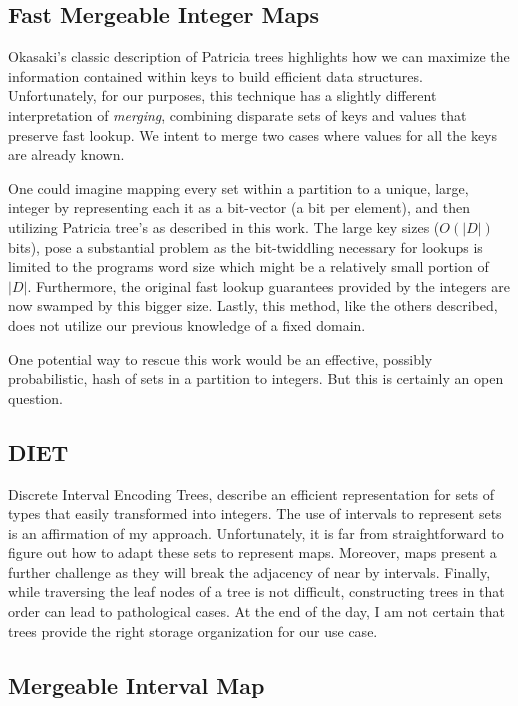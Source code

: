 \documentclass{article}
\begin{document}
\subsection{Fast Mergeable Integer Maps}

Okasaki's classic description\cite{Okasaki1998} of Patricia trees highlights how
we can maximize the information contained within keys to build efficient data
structures.
Unfortunately, for our purposes, this technique has a slightly different
interpretation of \emph{merging},
combining disparate sets of keys and values that preserve fast lookup.
We intent to merge two cases where values for all the keys are already known.

One could imagine mapping every set within a partition to a unique, large,
integer by representing each it as a bit-vector (a bit per element), and then
utilizing Patricia tree's as described in this work.
The large key sizes ($O(|D|)$ bits),
pose a substantial problem as the bit-twiddling necessary for lookups is
limited to the programs word size which might be a relatively small portion
of $|D|$.
Furthermore, the original fast lookup guarantees provided by the integers are
now swamped by this bigger size.
Lastly, this method, like the others described, does not utilize our previous
knowledge of a fixed domain.

One potential way to rescue this work would be an effective,
possibly probabilistic,
hash of sets in a partition to integers.
But this is certainly an open question.

\subsection{DIET}

Discrete Interval Encoding Trees\cite{Erwig1993},
describe an efficient representation for sets of types that easily transformed
into integers.
The use of intervals to represent sets is an affirmation of my approach.
Unfortunately, it is far from straightforward to figure out how to adapt these
sets to represent maps.
Moreover, maps present a further challenge as they will break the adjacency of
near by intervals.
Finally,
while traversing the leaf nodes of a tree is not difficult,
constructing trees in that order can lead to pathological cases.
At the end of the day,
I am not certain that trees provide the right storage organization for our use
case.

\subsection{Mergeable Interval Map}
\end{document}
